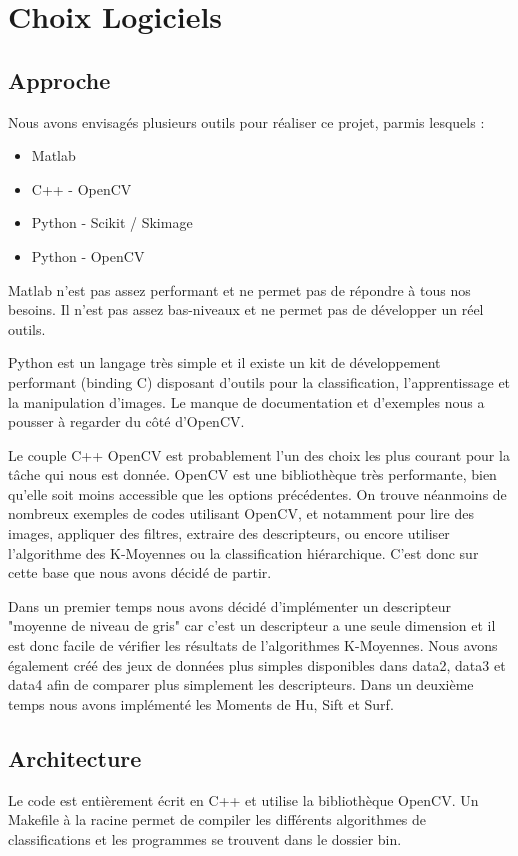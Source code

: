 \documentclass[12pt,a4paper,utf8x]{report}
\begin{document}
\chapter{Choix Logiciels}

\section{Approche}
    Nous avons envisagés plusieurs outils pour réaliser ce projet, parmis lesquels :

    \begin{itemize}
        \item Matlab
        \item C++ - OpenCV
        \item Python - Scikit / Skimage
        \item Python - OpenCV
    \end{itemize}

    Matlab n'est pas assez performant et ne permet pas de répondre à tous nos besoins. Il n'est pas assez bas-niveaux et ne permet pas de développer un réel outils.

    Python est un langage très simple et il existe un kit de développement performant (binding C) disposant d'outils pour la classification, l'apprentissage et la manipulation d'images. Le manque de documentation et d'exemples nous a pousser à regarder du côté d'OpenCV.

    Le couple C++ OpenCV est probablement l'un des choix les plus courant pour la tâche qui nous est donnée. OpenCV est une bibliothèque très performante, bien qu'elle soit moins accessible que les options précédentes. On trouve néanmoins de nombreux exemples de codes utilisant OpenCV, et notamment pour lire des images, appliquer des filtres, extraire des descripteurs, ou encore utiliser l'algorithme des K-Moyennes ou la classification hiérarchique. C'est donc sur cette base que nous avons décidé de partir.

    Dans un premier temps nous avons décidé d'implémenter un descripteur "moyenne de niveau de gris" car c'est un descripteur a une seule dimension et il est donc facile de vérifier les résultats de l'algorithmes K-Moyennes. Nous avons également créé des jeux de données plus simples disponibles dans data2, data3 et data4 afin de comparer plus simplement les descripteurs. Dans un deuxième temps nous avons implémenté les Moments de Hu, Sift et Surf.


\section{Architecture}
    Le code est entièrement écrit en C++ et utilise la bibliothèque OpenCV. Un Makefile à la racine permet de compiler les différents algorithmes de classifications et les programmes se trouvent dans le dossier bin.
\end{document}
